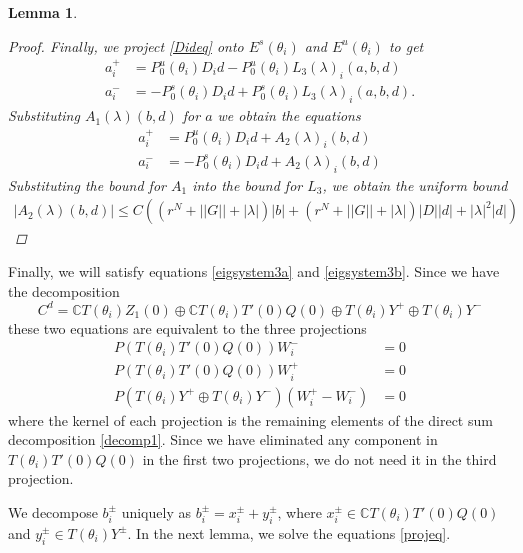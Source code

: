 \documentclass[12pt]{article}
\def\C{{\mathbb C}}
\newtheorem{lemma}{Lemma}
\begin{document}
\begin{lemma}
\begin{proof}
Finally, we project \eqref{Dideq} onto $E^s(\theta_i)$ and $E^u(\theta_i)$ to get
\begin{align*}
a_i^+ &= P_0^u(\theta_i) D_i d - P_0^u(\theta_i) L_3(\lambda)_i(a,b,d) \\
a_i^- &= -P_0^s(\theta_i) D_i d + P_0^s(\theta_i) L_3(\lambda)_i(a,b,d).
\end{align*}
Substituting $A_1(\lambda)(b,d)$ for $a$ we obtain the equations
\begin{align*}
a_i^+ &= P_0^u(\theta_i) D_i d + A_2(\lambda)_i(b,d) \\
a_i^- &= -P_0^s(\theta_i) D_i d + A_2(\lambda)_i(b,d)
\end{align*}
Substituting the bound for $A_1$ into the bound for $L_3$, we obtain the uniform bound
\begin{align*}
|A_2(\lambda)(b,d)| \leq 
C\left( (r^N + ||G|| + |\lambda| )|b| + (r^N + ||G|| + |\lambda|)|D||d| + |\lambda|^2 |d|  \right)
\end{align*}
\end{proof}
\end{lemma}

Finally, we will satisfy equations \eqref{eigsystem3a} and \eqref{eigsystem3b}. Since we have the decomposition
\begin{equation}\label{decomp1}
C^d = \C T(\theta_i) Z_1(0) \oplus \C T(\theta_i) T'(0)Q(0) \oplus T(\theta_i) Y^+ \oplus T(\theta_i) Y^-
\end{equation}
these two equations are equivalent to the three projections
\begin{equation}\label{projeq}
\begin{aligned}
P(T(\theta_i) T'(0)Q(0)) W_i^- &= 0 \\
P(T(\theta_i) T'(0)Q(0)) W_i^+ &= 0 \\
P(T(\theta_i) Y^+ \oplus T(\theta_i) Y^-) (W_i^+ - W_i^-) &= 0
\end{aligned}
\end{equation}
where the kernel of each projection is the remaining elements of the direct sum decomposition \eqref{decomp1}. Since we have eliminated any component in $T(\theta_i) T'(0)Q(0)$ in the first two projections, we do not need it in the third projection.

We decompose $b_i^\pm$ uniquely as $b_i^\pm = x_i^\pm + y_i^\pm$, where $x_i^\pm \in \C T(\theta_i) T'(0)Q(0)$ and $y_i^\pm \in T(\theta_i) Y^\pm$. In the next lemma, we solve the equations \eqref{projeq}.
\end{document}
